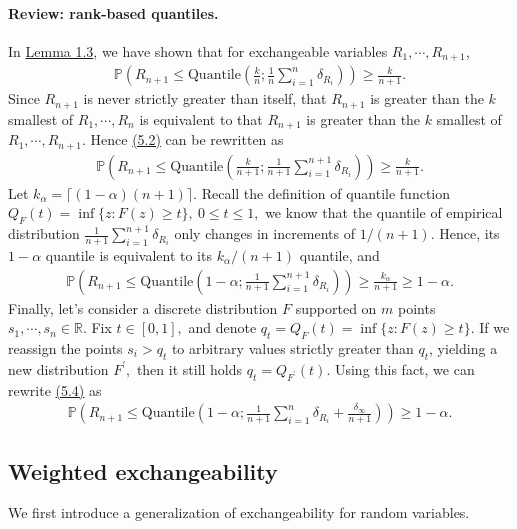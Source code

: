 \documentclass{article}
\numberwithin{equation}{section}
\begin{document}
\paragraph{Review: rank-based quantiles.} In \hyperref[Lemma 1.3]{Lemma 1.3}, we have shown that for exchangeable variables $R_1,\cdots,R_{n+1}$,
\begin{align*}
	\mathbb{P}\left(R_{n+1}\leq\mathrm{Quantile}\left(\frac{k}{n};\frac{1}{n}\sum_{i=1}^n\delta_{R_i}\right)\right)\geq \frac{k}{n+1}.\tag{5.2}\label{5.2}
\end{align*}
Since $R_{n+1}$ is never strictly greater than itself, that $R_{n+1}$ is greater than the $k$ smallest of $R_1,\cdots,R_n$ is equivalent to that $R_{n+1}$ is greater than the $k$ smallest of $R_1,\cdots,R_{n+1}.$ Hence \hyperref[5.2]{(5.2)} can be rewritten as
\begin{align*}
	\mathbb{P}\left(R_{n+1}\leq\mathrm{Quantile}\left(\frac{k}{n+1};\frac{1}{n+1}\sum_{i=1}^{n+1}\delta_{R_i}\right)\right)\geq \frac{k}{n+1}.\tag{5.3}
\end{align*}
Let $k_\alpha=\lceil(1-\alpha)(n+1)\rceil.$ Recall the definition of quantile function $Q_F(t)=\inf\{z:F(z)\geq t\},\ 0\leq t\leq 1,$ we know that the quantile of empirical distribution $\frac{1}{n+1}\sum_{i=1}^{n+1}\delta_{R_i}$ only changes in increments of ${1}/(n+1).$ Hence, its $1-\alpha$ quantile is equivalent to its 
$k_\alpha/(n+1)$ quantile, and
\begin{align*}
	\mathbb{P}\left(R_{n+1}\leq\mathrm{Quantile}\left(1-\alpha;\frac{1}{n+1}\sum_{i=1}^{n+1}\delta_{R_i}\right)\right)\geq \frac{k_\alpha}{n+1} \geq 1-\alpha.\tag{5.4}\label{5.4}
\end{align*}
Finally, let's consider a discrete distribution $F$ supported on $m$ points $s_1,\cdots,s_n\in\mathbb{R}.$ Fix $t\in[0,1],$ and denote $q_t = Q_F(t)=\inf\{z:F(z)\geq t\}.$ If we reassign the points $s_i > q_t$ to arbitrary values strictly greater than $q_t$, yielding a new distribution $F^\prime,$ then it still holds $q_t=Q_{F^\prime}(t)$. Using this fact, we can rewrite \hyperref[5.4]{(5.4)} as
\begin{align*}
	\mathbb{P}\left(R_{n+1}\leq\mathrm{Quantile}\left(1-\alpha;\frac{1}{n+1}\sum_{i=1}^{n}\delta_{R_i} + \frac{\delta_\infty}{n+1}\right)\right) \geq 1-\alpha.\tag{5.5}\label{5.5}
\end{align*}

\subsection{Weighted exchangeability}
We first introduce a generalization of exchangeability for random variables.
\end{document}
